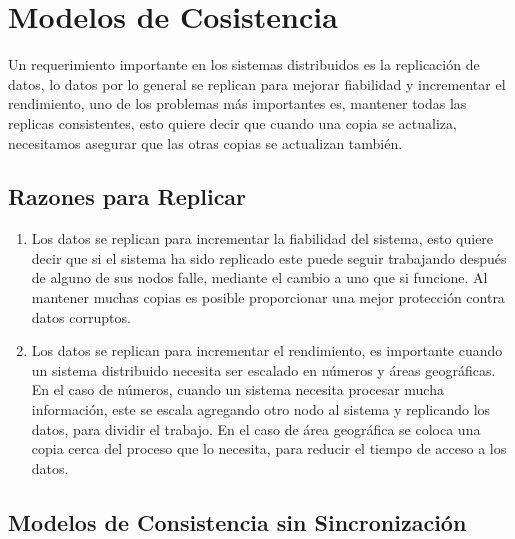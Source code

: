 
\chapter{Modelos de Cosistencia} %

\label{ch:modelos_consistencia} %

Un requerimiento importante en los sistemas distribuidos es la replicación de datos, lo datos por lo general se replican para mejorar fiabilidad y incrementar el rendimiento, uno de los problemas más importantes es, mantener todas las replicas consistentes, esto quiere decir que cuando una copia se actualiza, necesitamos asegurar que las otras copias se actualizan también.  


\section{Razones para Replicar}

\begin{enumerate}
\item Los datos se replican para incrementar la fiabilidad del sistema, esto quiere decir que si el sistema ha sido replicado este puede seguir trabajando después de alguno de sus nodos falle, mediante el cambio a uno que si funcione. Al mantener muchas copias es posible proporcionar una mejor protección contra datos corruptos. 
\item Los datos se replican para incrementar el rendimiento, es importante cuando un sistema distribuido necesita ser escalado en números y áreas geográficas. En el caso de números, cuando un sistema necesita procesar mucha información, este se escala agregando otro nodo al sistema y replicando los datos, para dividir el trabajo. En el caso de área geográfica se coloca una copia cerca del proceso que lo necesita, para reducir el tiempo de acceso a los datos.

\end{enumerate}


\section{Modelos de Consistencia sin Sincronización}


